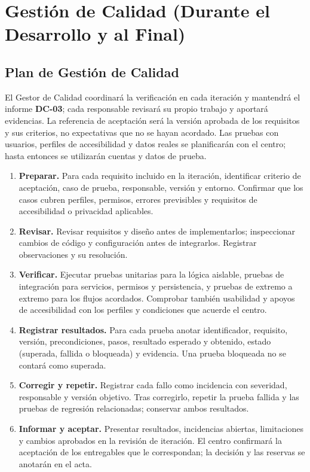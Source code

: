\newpage
\section{Gestión de Calidad (Durante el Desarrollo y al Final)}
\subsection{Plan de Gestión de Calidad}
El Gestor de Calidad coordinará la verificación en cada iteración y mantendrá el informe \textbf{DC-03}; cada responsable revisará su propio trabajo y aportará evidencias. La referencia de aceptación será la versión aprobada de los requisitos y sus criterios, no expectativas que no se hayan acordado. Las pruebas con usuarios, perfiles de accesibilidad y datos reales se planificarán con el centro; hasta entonces se utilizarán cuentas y datos de prueba. 

\begin{enumerate}[leftmargin=*]
  \item \textbf{Preparar.} Para cada requisito incluido en la iteración, identificar criterio de aceptación, caso de prueba, responsable, versión y entorno. Confirmar que los casos cubren perfiles, permisos, errores previsibles y requisitos de accesibilidad o privacidad aplicables.
  \item \textbf{Revisar.} Revisar requisitos y diseño antes de implementarlos; inspeccionar cambios de código y configuración antes de integrarlos. Registrar observaciones y su resolución.
  \item \textbf{Verificar.} Ejecutar pruebas unitarias para la lógica aislable, pruebas de integración para servicios, permisos y persistencia, y pruebas de extremo a extremo para los flujos acordados. Comprobar también usabilidad y apoyos de accesibilidad con los perfiles y condiciones que acuerde el centro.
  \item \textbf{Registrar resultados.} Para cada prueba anotar identificador, requisito, versión, precondiciones, pasos, resultado esperado y obtenido, estado (superada, fallida o bloqueada) y evidencia. Una prueba bloqueada no se contará como superada.
  \item \textbf{Corregir y repetir.} Registrar cada fallo como incidencia con severidad, responsable y versión objetivo. Tras corregirlo, repetir la prueba fallida y las pruebas de regresión relacionadas; conservar ambos resultados.
  \item \textbf{Informar y aceptar.} Presentar resultados, incidencias abiertas, limitaciones y cambios aprobados en la revisión de iteración. El centro confirmará la aceptación de los entregables que le correspondan; la decisión y las reservas se anotarán en el acta.
\end{enumerate}

